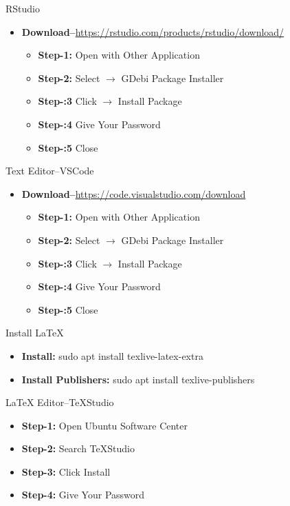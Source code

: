 \begin{frame}[t]{RStudio}
	\begin{itemize}
		\item 
		\textbf{Download--}\url{https://rstudio.com/products/rstudio/download/}
		\begin{itemize}
			\item \textbf{Step-1:}  Open with Other Application 
			\item \textbf{Step-2:}  Select $\rightarrow$ GDebi Package Installer
			\item \textbf{Step-:3}  Click $\rightarrow$ Install Package 
			\item \textbf{Step-:4}  Give Your Password 
			\item \textbf{Step-:5}  Close 
		\end{itemize}
	\end{itemize}
\end{frame}
\begin{frame}[t]{Text Editor--VSCode}
		\begin{itemize}
		\item 
		\textbf{Download--}\url{https://code.visualstudio.com/download}
		\begin{itemize}
			\item \textbf{Step-1:}  Open with Other Application 
			\item \textbf{Step-2:}  Select $\rightarrow$ GDebi Package Installer
			\item \textbf{Step-:3}  Click $\rightarrow$ Install Package 
			\item \textbf{Step-:4}  Give Your Password 
			\item \textbf{Step-:5}  Close 
		\end{itemize}
	\end{itemize}
\end{frame}

\begin{frame}[t]{Install \LaTeX}
	\begin{itemize}
		\item \textbf{Install:} sudo apt install texlive-latex-extra
		\item \textbf{Install Publishers:} sudo apt install 
		texlive-publishers
	\end{itemize}
\end{frame}


\begin{frame}[t]{{\LaTeX} Editor--TeXStudio}
	\begin{itemize}
		\item \textbf{Step-1:} Open Ubuntu Software Center
		\item \textbf{Step-2:} Search TeXStudio
		\item \textbf{Step-3:} Click Install 
		\item \textbf{Step-4:} Give Your Password 
	\end{itemize}
\end{frame}


